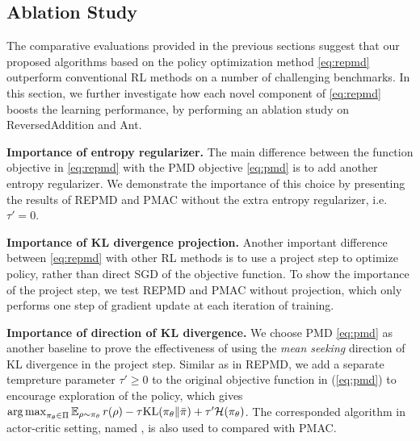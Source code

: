 \subsection{Ablation Study}
\label{subsec:ablationstudy}

The comparative evaluations provided in the previous sections suggest that our proposed algorithms based on the policy optimization method \ref{eq:repmd} outperform conventional RL methods on a number of challenging benchmarks. In this section, we further investigate how each novel component of \cref{eq:repmd} boosts the learning performance, by performing an ablation study on ReversedAddition and Ant.


\textbf{Importance of entropy regularizer.} The main difference between the function objective in \cref{eq:repmd} with the PMD objective \cref{eq:pmd} is to add another entropy regularizer. We demonstrate the importance of this choice by presenting the results of REPMD and PMAC without the extra entropy regularizer, i.e. $\tau'=0$.

\textbf{Importance of KL divergence projection.} Another important difference between \cref{eq:repmd} with other RL methods is to use a project step to optimize policy, rather than direct SGD of the objective function. To show the importance of the project step, we test REPMD and PMAC without projection, which only performs one step of gradient update at each iteration of training. 

\textbf{Importance of direction of KL divergence.} We choose PMD \ref{eq:pmd} as another baseline to prove the effectiveness of using the \emph{mean seeking} direction of KL divergence in the project step. Similar as in REPMD, we add a separate tempreture parameter $\tau'\geq 0$ to the original objective function in (\ref{eq:pmd}) to encourage exploration of the policy, which gives $\operatorname*{arg\,max}_{\pi_\theta \in \Pi}{ \operatorname*{\mathbb{E}}_{\rho \sim \pi_\theta}{  r(\rho)  - \tau \text{KL}(\pi_\theta \| \bar{\pi}) } + \tau'\mathcal{H}(\pi_\theta) }$. The corresponded algorithm in actor-critic setting, named , is also used to compared with PMAC. 

